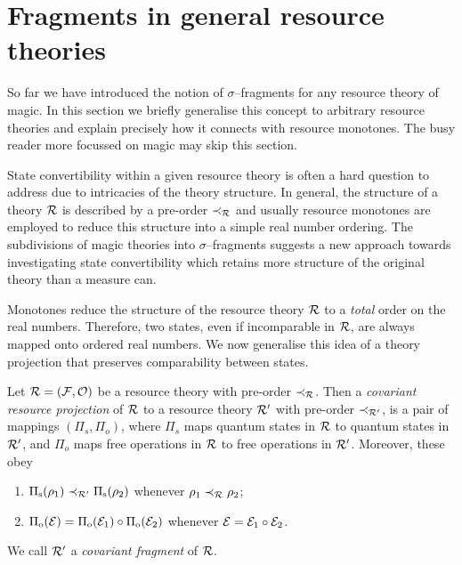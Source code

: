 \documentclass[pra,
aps,
twocolumn,
superscriptaddress,
groupedaddress,
nofootinbib,
reprint
]{revtex4-1}
\begin{document}


\section{Fragments in general resource theories}
\label{sec:general_resources}


So far we have introduced the notion of $\sigma$--fragments for any resource theory of magic. 
In this section we briefly generalise this concept to arbitrary resource theories and explain precisely how it connects with resource monotones. 
The busy reader more focussed on magic may skip this section.

State convertibility within a given resource theory is often a hard question to address due to intricacies of the theory structure.
In general, the structure of a theory $\mathcal{R}$ is described by a pre-order $\prec_{\mathcal{R}}$ and usually resource monotones are employed to reduce this structure into a simple real number ordering.
The subdivisions of magic theories into $\sigma$--fragments suggests a new approach towards investigating state convertibility which retains more structure of the original theory than a measure can.

Monotones reduce the structure of the resource theory $\mathcal{R}$ to a \emph{total} order on the real numbers.
Therefore, two states, even if incomparable in $\mathcal{R}$, are always mapped onto ordered real numbers.
We now generalise this idea of a theory projection that preserves comparability between states. 
\begin{definition}\label{def:covproj}
Let $\mathcal{R} = (\mathcal{F}, \mathcal{O})$ be a resource theory with pre-order $\prec_{\mathcal{R}}$. 
Then a \emph{covariant resource projection} of $\mathcal{R}$ to a resource theory $\mathcal{R}'$ with pre-order $\prec_{\mathcal{R}'}$, is a pair of mappings $(\Pi_s, \Pi_o)$, where $\Pi_s$ maps quantum states in $\mathcal{R}$ to quantum states in $\mathcal{R}'$, and $\Pi_o$ maps free operations in $\mathcal{R}$ to free operations in $\mathcal{R}'$. 
Moreover, these obey
	\begin{enumerate}
        \item $\Pi_{\rm{s}}(\rho_1) \prec_{\mathcal{R}'} \Pi_{\rm{s}}(\rho_2)$ whenever $\rho_1 \prec_{\mathcal{R}} \rho_2$;
        \item $\Pi_{\rm{o}}(\mathcal{E}) = \Pi_{\rm{o}}(\mathcal{E}_1) \circ \Pi_{\rm{o}}(\mathcal{E}_2)$ whenever $\mathcal{E} = \mathcal{E}_1 \circ \mathcal{E}_2$.
    \end{enumerate}
We call $\mathcal{R}'$ a \emph{covariant fragment} of $\mathcal{R}$.
\end{definition}
\end{document}
